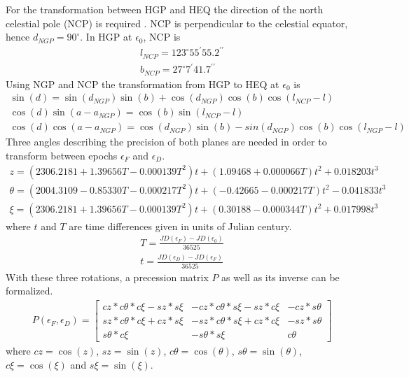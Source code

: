 \documentclass[letterpaper,10pt,english]{sphinxmanual}
\begin{document}
\sphinxAtStartPar
For the transformation between HGP and HEQ the direction of the north celestial pole (NCP) is required .
NCP is perpendicular to the celestial equator, hence \(d_{NGP} = 90^{\circ}\).
In HGP at \(\epsilon_0\), NCP is
\begin{equation*}
\begin{split}l_{NCP} = 123^{\circ}55^\prime55.2^{\prime\prime}\\
b_{NCP} = 27^{\circ}7^\prime41.7^{\prime\prime}\end{split}
\end{equation*}
\sphinxAtStartPar
Using NGP and NCP the transformation from HGP to HEQ at \(\epsilon_0\) is
\begin{equation*}
\begin{split}\sin(d) = \sin(d_{NGP})\sin(b) + \cos(d_{NGP})\cos(b)\cos(l_{NCP}-l) \\
\cos(d)\sin(a-a_{NGP}) = \cos(b)\sin(l_{NCP}-l) \\
\cos(d)\cos(a-a_{NGP}) = \cos(d_{NGP})\sin(b)-sin(d_{NGP})\cos(b)\cos(l_{NGP}-l)\end{split}
\end{equation*}
\sphinxAtStartPar
Three angles describing the precision of both planes are needed in order to transform between epochs \(\epsilon_F\) and \(\epsilon_D\).
\begin{equation*}
\begin{split}z = (2306.2181+1.39656T - 0.000139T^2 )t + (1.09468 + 0.000066T)t^2 + 0.018203t^3 \\
\theta =(2004.3109 - 0.85330T-0.000217T^2)t + (-0.42665-0.000217T)t^2 - 0.041833t^3 \\
\xi = (2306.2181+1.39656T-0.000139T^2)t+(0.30188-0.000344T)t^2+0.017998t^3\end{split}
\end{equation*}
\sphinxAtStartPar
where \(t\) and \(T\) are time differences given in units of Julian century.
\begin{equation*}
\begin{split}T = \frac{JD(\epsilon_F)-JD(\epsilon_0)}{36525} \\
t = \frac{JD(\epsilon_D)-JD(\epsilon_F)}{36525}\end{split}
\end{equation*}
\sphinxAtStartPar
With these three rotations, a precession matrix \(P\) as well as its inverse can be formalized.
\begin{equation*}
\begin{split}P(\epsilon_F,\epsilon_D) = \begin{bmatrix}
cz*c\theta*c\xi-sz*s\xi & -cz*c\theta*s\xi-sz*c\xi & -cz*s\theta\\
sz*c\theta*c\xi+cz*s\xi & -sz*c\theta*s\xi+cz*c\xi & -sz*s\theta\\
s\theta*c\xi & -s\theta*s\xi & c\theta
\end{bmatrix}\end{split}
\end{equation*}
\sphinxAtStartPar
where \(cz = \cos(z)\), \(sz = \sin(z)\), \(c\theta = \cos(\theta)\), \(s\theta = \sin(\theta)\),
\(c\xi = \cos(\xi)\) and \(s\xi = \sin(\xi)\).
\end{document}
